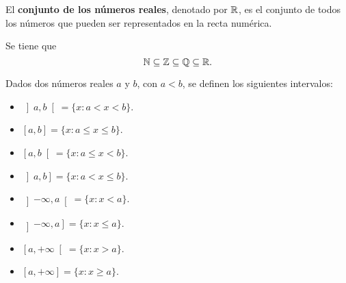 \documentclass[a4,11pt]{aleph-notas}
\begin{document}
\begin{defi}
    El \textbf{conjunto de los números reales}, denotado por $\mathbb{R}$, es el conjunto de todos los números que pueden ser representados en la recta numérica.
\end{defi}

\begin{teo}
    Se tiene que
    \[
        \mathbb{N} \subseteq \mathbb{Z} \subseteq \mathbb{Q} \subseteq \mathbb{R}.
    \]
\end{teo}

\begin{defi}[Intevalos]
    Dados dos números reales $a$ y $b$, con $a < b$, se definen los siguientes intervalos:
    \begin{itemize}
        \item $\left]a, b\right[ = \{x : a < x < b\}$.
        \item $[a, b] = \{x : a \leq x \leq b\}$.
        \item $\left[a, b\right[ = \{x : a \leq x < b\}$.
        \item $\left]a, b\right] = \{x : a < x \leq b\}$.
        \item $\left]-\infty, a\right[ = \{x : x < a\}$.
        \item $\left]-\infty, a\right] = \{x : x \leq a\}$.
        \item $\left[a, +\infty\right[ = \{x : x > a\}$.
        \item $\left[a, +\infty\right] = \{x : x \geq a\}$.
    \end{itemize}
\end{defi}
    
\end{document}
